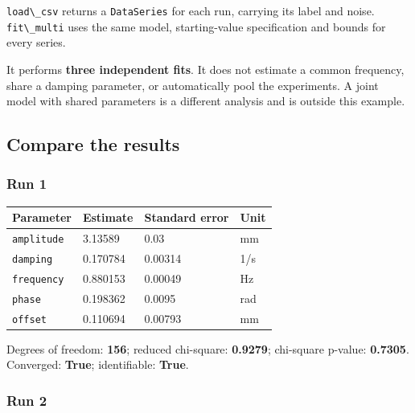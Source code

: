 \documentclass[
  british,
  10pt,
  a4paper,
]{article}
\newcommand{\passthrough}[1]{#1}
\begin{document}
\passthrough{\lstinline!load\_csv!} returns a
\passthrough{\lstinline!DataSeries!} for each run, carrying its label
and noise. \passthrough{\lstinline!fit\_multi!} uses the same model,
starting-value specification and bounds for every series.

It performs \textbf{three independent fits}. It does not estimate a
common frequency, share a damping parameter, or automatically pool the
experiments. A joint model with shared parameters is a different
analysis and is outside this example.


\subsection{Compare the results}\label{compare-the-results}


\subsubsection{Run 1}\label{run-1}

\begin{longtable}[]{@{}llll@{}}
\toprule\noalign{}
Parameter & Estimate & Standard error & Unit \\
\midrule\noalign{}
\endhead
\bottomrule\noalign{}
\endlastfoot
\passthrough{\lstinline!amplitude!} & 3.13589 & 0.03 & mm \\
\passthrough{\lstinline!damping!} & 0.170784 & 0.00314 & 1/s \\
\passthrough{\lstinline!frequency!} & 0.880153 & 0.00049 & Hz \\
\passthrough{\lstinline!phase!} & 0.198362 & 0.0095 & rad \\
\passthrough{\lstinline!offset!} & 0.110694 & 0.00793 & mm \\
\end{longtable}

Degrees of freedom: \textbf{156}; reduced chi-square: \textbf{0.9279};
chi-square p-value: \textbf{0.7305}. Converged: \textbf{True};
identifiable: \textbf{True}.


\subsubsection{Run 2}\label{run-2}
\end{document}
